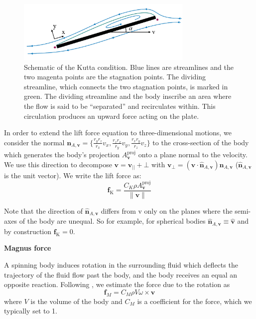 \documentclass[sn-mathphys-num]{sn-jnl}%
\theoremstyle{thmstyleone}	%
\theoremstyle{thmstyletwo}	%
\theoremstyle{thmstylethree}	%
\begin{document}
\begin{appendices}
\begin{figure}[!htb] 
	\centering
	\includegraphics[width=0.75\textwidth]{fig/supplementary_fig_1.png}
	\caption{
		Schematic of the Kutta condition. 
		Blue lines are streamlines and the two magenta points are the stagnation points. 
		The dividing streamline, which connects the two stagnation points, is marked in green. 
		The dividing streamline and the body inscribe an area where the flow is said to be “separated” and recirculates within. 
		This circulation produces an upward force acting on the plate.
	}
	\label{fig:supplementary_fig_1}
\end{figure}

In order to extend the lift force equation to three-dimensional motions, we consider the normal $ \mathbf{n}_{A, \mathbf{v}} = \{ \frac{r_y r_z}{r_x} v_x, \frac{r_z r_x}{r_y} v_y, \frac{r_x r_y}{r_z} v_z \} $ to the cross-section of the body which generates the body's projection $ A_\mathbf{v}^\text{proj} $ onto a plane normal to the velocity. 
We use this direction to decompose  $ \mathbf{v} = \mathbf{v}_{||} + \mathbf{\bot} $ with $ \mathbf{v}_\bot = (\mathbf{v} \cdot \hat{\mathbf{n}}_{A,\mathbf{v}}) \hat{\mathbf{n}}_{A, \mathbf{v}} $ ($ \hat{\mathbf{n}}_{A, \mathbf{v}} $ is the unit vector). 
We write the lift force as:
%
\begin{equation}\label{key}
	\mathbf{f}_\text{K} = 
		\frac{
			C_K \rho A_\mathbf{v}^\text{proj}
		}{
			\| \mathbf{v} \|
		}
\end{equation}


Note that the direction of $ \hat{\mathbf{n}}_{A, \mathbf{v}} $ differs from v only on the planes where the semi-axes of the body are unequal. 
So for example, for spherical bodies $ \hat{\mathbf{n}}_{A, \mathbf{v}} \equiv \hat{\mathbf{v}}  $ and by construction $ \mathbf{f}_\text{K} = 0 $.



\textbf{Magnus force}

A spinning body induces rotation in the surrounding fluid which deflects the trajectory of the fluid flow past the body, and the body receives an equal an opposite reaction. 
Following \cite{andersen2005analysis}, we estimate the force due to the rotation as
\begin{equation}\label{eq:magus_force}
	\mathbf{f}_M = 
		C_M \rho V \omega \times \mathbf{v}
\end{equation}
%
where $ V $ is the volume of the body and $ C_M $ is a coefficient for the force, which we typically set to 1.



\end{appendices}
\end{document}
